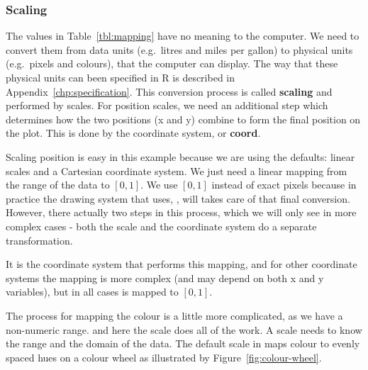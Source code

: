 \subsubsection{Scaling} 

The values in Table~\ref{tbl:mapping} have no meaning to the computer.  We need to convert them from data units (e.g.\ litres and miles per gallon) to physical units (e.g.\ pixels and colours), that the computer can display.  The way that these physical units can been specified in R is described in Appendix~\ref{chp:specification}.  This conversion process is called {\bf scaling} and performed by scales.  For position scales, we need an additional step which determines how the two positions (x and y) combine to form the final position on the plot.  This is done by the coordinate system, or {\bf coord}.

Scaling position is easy in this example because we are using the defaults: linear scales and a Cartesian coordinate system.  We just need a linear mapping from the range of the data to $[0, 1]$.  We use $[0, 1]$ instead of exact pixels because in practice the drawing system that \ggplot uses, , will takes care of that final conversion.  However, there actually two steps in this process, which we will only see in more complex cases - both the scale and the coordinate system do a separate transformation.

It is the coordinate system that performs this mapping, and for other coordinate systems the mapping is more complex (and may depend on both x and y variables), but in all cases is mapped to $[0, 1]$.

The process for mapping the colour is a little more complicated, as we have a  non-numeric range.  and here the scale does all of the work.  A scale needs to know the range and the domain of the data.  The default scale in \ggplot maps colour to evenly spaced hues on a colour wheel as illustrated by Figure~\ref{fig:colour-wheel}.



